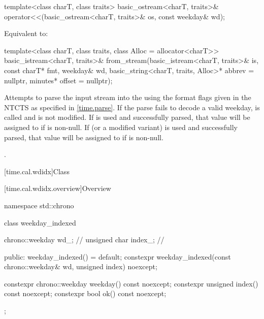%
\begin{itemdecl}
template<class charT, class traits>
  basic_ostream<charT, traits>&
    operator<<(basic_ostream<charT, traits>& os, const weekday& wd);
\end{itemdecl}

\begin{itemdescr}
\pnum
\effects
Equivalent to:
\end{itemdescr}

%
\begin{itemdecl}
template<class charT, class traits, class Alloc = allocator<charT>>
  basic_istream<charT, traits>&
    from_stream(basic_istream<charT, traits>& is, const charT* fmt,
                weekday& wd, basic_string<charT, traits, Alloc>* abbrev = nullptr,
                minutes* offset = nullptr);
\end{itemdecl}

\begin{itemdescr}
\pnum
\effects
Attempts to parse the input stream 
into the   using
the format flags given in the NTCTS 
as specified in \ref{time.parse}.
If the parse fails to decode a valid weekday,
 is called and
 is not modified.
If  is used and successfully parsed,
that value will be assigned to  if  is non-null.
If  (or a modified variant) is used and successfully parsed,
that value will be assigned to  if  is non-null.

\pnum
\returns
{}.
\end{itemdescr}

[time.cal.wdidx]{Class }

[time.cal.wdidx.overview]{Overview}

\begin{codeblock}
namespace std::chrono {
  class weekday_indexed {
    chrono::weekday  wd_;       // \expos
    unsigned char    index_;    // \expos

  public:
    weekday_indexed() = default;
    constexpr weekday_indexed(const chrono::weekday& wd, unsigned index) noexcept;

    constexpr chrono::weekday weekday() const noexcept;
    constexpr unsigned        index()   const noexcept;
    constexpr bool ok() const noexcept;
  };
}
\end{codeblock}

